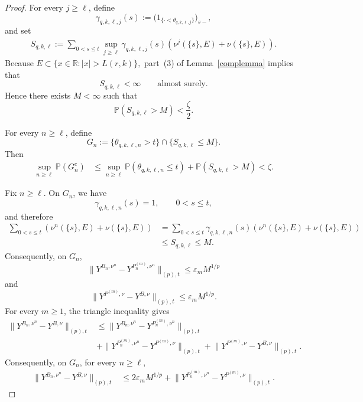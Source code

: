 \documentclass[a4paper,10pt]{article}
\renewcommand{\P}{\mathbb P}
\begin{document}
\begin{proof}
For every \(j\ge\ell\), define
\[
        \gamma_{q,k,\ell,j}(s)
        :=
        \bigl(
        1_{\{\cdot<\theta_{q,k,\ell,j}\}}
        \bigr)_{s-},
\]
and set
\[
\begin{aligned}
S_{q,k,\ell}
:=
\sum_{0<s\le t}
\sup_{j\ge\ell}
\gamma_{q,k,\ell,j}(s)
\left(
        \nu^j(\{s\},E)
        +
        \nu(\{s\},E)
\right).
\end{aligned}
\]
Because
$
        E
        \subset
        \{x\in\mathbb R:|x|>L(r,k)\},
$
part~(3) of Lemma~\ref{complemma} implies that
\[
        S_{q,k,\ell}<\infty
        \qquad\text{almost surely}.
\]
Hence there exists \(M<\infty\) such that
\[
        \P(S_{q,k,\ell}>M)
        <
        \frac{\zeta}{2}.
\]

For every \(n\ge\ell\), define
\[
        G_n
        :=
        \{\theta_{q,k,\ell,n}>t\}
        \cap
        \{S_{q,k,\ell}\le M\}.
\]
Then
\[
\begin{aligned}
\sup_{n\ge\ell}\P(G_n^c)
&\le
\sup_{n\ge\ell}
\P(\theta_{q,k,\ell,n}\le t)
+
\P(S_{q,k,\ell}>M)
<
\zeta.
\end{aligned}
\]

Fix \(n\ge\ell\). On \(G_n\), we have
\[
        \gamma_{q,k,\ell,n}(s)=1,
        \qquad 0<s\le t,
\]
and therefore
\[
\begin{aligned}
\sum_{0<s\le t}
\left(
        \nu^n(\{s\},E)
        +
        \nu(\{s\},E)
\right)
&=
\sum_{0<s\le t}
\gamma_{q,k,\ell,n}(s)
\left(
        \nu^n(\{s\},E)
        +
        \nu(\{s\},E)
\right)
\\
&\le
S_{q,k,\ell}
\le
M.
\end{aligned}
\]
Consequently, on \(G_n\),
\[
\lVert
Y^{B_n,\nu^n}
-
Y^{P_n^{(m)},\nu^n}
\rVert_{(p),t}
\le
\varepsilon_mM^{1/p}
\]
and
\[
\lVert
Y^{P^{(m)},\nu}
-
Y^{B,\nu}
\rVert_{(p),t}
\le
\varepsilon_mM^{1/p}.
\]
For every \(m\ge1\), the triangle inequality gives
\[
\begin{aligned}
\lVert
Y^{B_n,\nu^n}-Y^{B,\nu}
\rVert_{(p),t}
&\le
\lVert
Y^{B_n,\nu^n}
-
Y^{P_n^{(m)},\nu^n}
\rVert_{(p),t}
\\
&+
\lVert
Y^{P_n^{(m)},\nu^n}
-
Y^{P^{(m)},\nu}
\rVert_{(p),t}
+
\lVert
Y^{P^{(m)},\nu}
-
Y^{B,\nu}
\rVert_{(p),t}.
\end{aligned}
\]
Consequently, on \(G_n\), for every \(n\ge\ell\),
\[
\begin{aligned}
\lVert
Y^{B_n,\nu^n}-Y^{B,\nu}
\rVert_{(p),t}
&\le
2\varepsilon_mM^{1/p}
+
\lVert
Y^{P_n^{(m)},\nu^n}
-
Y^{P^{(m)},\nu}
\rVert_{(p),t}.
\end{aligned}
\]


\end{proof}
\end{document}
